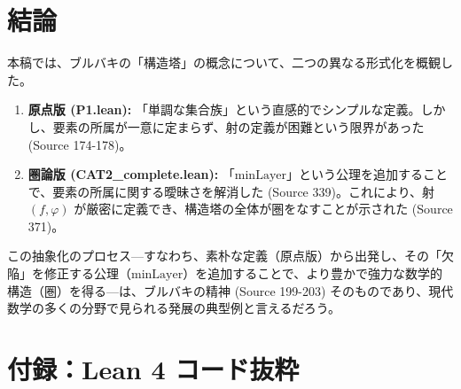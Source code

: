 \documentclass[11pt]{ltjsarticle}
\theoremstyle{definition}
\theoremstyle{plain}
\theoremstyle{remark}
\begin{document}
\section{結論}

本稿では、ブルバキの「構造塔」の概念について、二つの異なる形式化を概観した。
\begin{enumerate}
    \item \textbf{原点版 (P1.lean):} 「単調な集合族」という直感的でシンプルな定義。しかし、要素の所属が一意に定まらず、射の定義が困難という限界があった (Source 174-178)。
    \item \textbf{圏論版 (CAT2\_complete.lean):} 「$\text{minLayer}$」という公理を追加することで、要素の所属に関する曖昧さを解消した (Source 339)。これにより、射 $(f, \varphi)$ が厳密に定義でき、構造塔の全体が圏をなすことが示された (Source 371)。
\end{enumerate}

この抽象化のプロセス---すなわち、素朴な定義（原点版）から出発し、その「欠陥」を修正する公理（$\text{minLayer}$）を追加することで、より豊かで強力な数学的構造（圏）を得る---は、ブルバキの精神 (Source 199-203) そのものであり、現代数学の多くの分野で見られる発展の典型例と言えるだろう。

\newpage
\appendix
\section{付録：Lean 4 コード抜粋}
\end{document}
